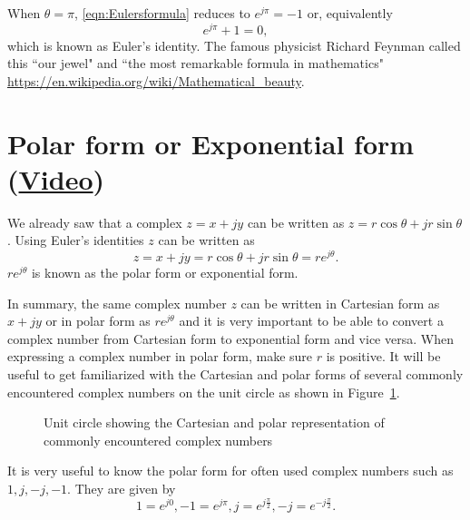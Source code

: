 When $\theta = \pi$, \eqref{eqn:Eulersformula} reduces to $e^{j \pi} = -1$ or, equivalently
\[
\boxed{e^{j \pi} + 1 = 0},
\]
which is known as Euler's identity. The famous physicist Richard Feynman called this
``our jewel" and ``the most remarkable formula in mathematics"
\url{https://en.wikipedia.org/wiki/Mathematical_beauty}.

\section{Polar form or Exponential form (\href{https://youtu.be/ypFkFwEQpL4}{Video})}
We already saw that a complex $z = x+jy$ can be written as $z = r \cos \theta + j r \sin \theta$.
Using Euler's identities $z$ can be written as
\begin{equation}
\label{eqn:polar2}
z = x +j y = r \cos \theta + j r \sin \theta = r e^{j \theta}.
\end{equation}
$r e^{j \theta}$ is known as the polar form or exponential form.

In summary, the same complex number $z$ can be written in Cartesian form as $x+jy$ or in polar form as $re^{j \theta}$
and it is
very important to be able to convert a complex number from Cartesian form to exponential form and vice versa.
When expressing a complex number in polar form, make sure $r$ is positive.
It will be useful to get familiarized with the Cartesian and polar forms of several commonly encountered complex numbers on the unit circle as shown in Figure~\ref{fig:unitcircledetailed}.
\begin{figure}[h]
  \centering
  
  \caption{Unit circle showing the Cartesian and polar representation of commonly encountered complex numbers}
  \label{fig:unitcircledetailed}
\end{figure}

\begin{example}
It is very useful to know the polar form for often used complex numbers such as $1,j,-j,-1$. They are given by
\[
\boxed{1 = e^{j0}, -1 = e^{j \pi}, j = e^{j \frac{\pi}{2}}, -j = e^{-j \frac{\pi}{2}}}.
\]
\end{example}

